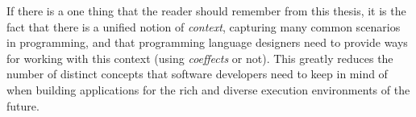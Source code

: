 \noindent
If there is a one thing that the reader should remember from this thesis, it is the fact that
there is a unified notion of \emph{context}, capturing many common scenarios in programming,
and that programming language designers need to provide ways for working with this context (using
\emph{coeffects} or not). This greatly reduces the number of distinct concepts that software
developers need to keep in mind of when building applications for the rich and diverse
execution environments of the future.

